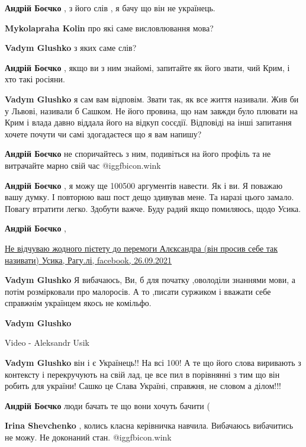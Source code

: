 \begin{itemize}
\begin{itemize}
\textbf{Андрій Боєчко} , з його слів , я бачу що він не українець.

\textbf{Mykolapraha Kolin} про які саме висловлювання мова?

\textbf{Vadym Glushko} з яких саме слів?

\textbf{Андрій Боєчко} , якщо ви з ним знайомі, запитайте як його звати, чий Крим, і хто такі росіяни.

\textbf{Vadym Glushko} я сам вам відповім. Звати так, як все життя називали. Жив би у Львові, називали б Сашком. Не його провина, що нам завжди було плювати на Крим і влада давно віддала його на відкуп сосєдії. Відповіді на інші запитання хочете почути чи самі здогадаєтеся що я вам напишу?

\textbf{Андрій Боєчко} не споричайтесь з ним, подивіться на його профіль та не витрачайте марно свій час  @igg{fbicon.wink} 

\textbf{Андрій Боєчко} , я можу ще 100500 аргументів навести. Як і ви. Я поважаю вашу думку. І повторюю ваш пост дещо здивував мене. Та наразі цього замало. Повагу втратити легко. Здобути важче. Буду радий якщо помиляюсь, щодо Усика.

\textbf{Андрій Боєчко} , 

\href{https://www.facebook.com/164585046890141/posts/4966019730079958/}{%
Не відчуваю жодного пієтету до перемоги Алєксандра (він просив себе так називати) Усика, %
Рагу.лі, facebook, 26.09.2021%
}

\textbf{Vadym Glushko} Я вибачаюсь, Ви, б для початку ,оволоділи знаннями мови, а потім розмірковали про малоросів. А то ,писати суржиком і вважати себе справжнім українцем якось не комільфо.

\textbf{Vadym Glushko}

Video - Aleksandr Usik

\textbf{Vadym Glushko} він і є Українець!! На всі 100! А те що його слова виривають з контексту і перекручують на свій лад, це все пил в порівнянні з тим що він робить для україни! Сашко це Слава Україні, справжня, не словом а ділом!!!

\textbf{Андрій Боєчко} люди бачать те що вони хочуть бачити (

\textbf{Irina Shevchenko} , колись класна керівничка навчила. Вибачаюсь вибачитись не можу. Не доконаний стан.  @igg{fbicon.wink} 


\end{itemize}
\end{itemize}
